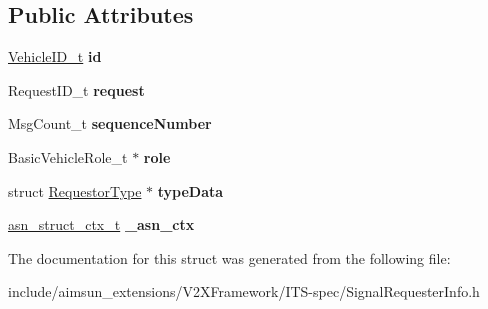 \subsection*{Public Attributes}
\begin{DoxyCompactItemize}
\item 
\hyperlink{structVehicleID}{Vehicle\+I\+D\+\_\+t} {\bfseries id}\hypertarget{structSignalRequesterInfo_af3175472ac3b7bd8cdb76166fe97465c}{}\label{structSignalRequesterInfo_af3175472ac3b7bd8cdb76166fe97465c}

\item 
Request\+I\+D\+\_\+t {\bfseries request}\hypertarget{structSignalRequesterInfo_ab98c6988435c103fba82e3397c63f6f2}{}\label{structSignalRequesterInfo_ab98c6988435c103fba82e3397c63f6f2}

\item 
Msg\+Count\+\_\+t {\bfseries sequence\+Number}\hypertarget{structSignalRequesterInfo_ab82a5a92546ccdc2cc8b646924099cfe}{}\label{structSignalRequesterInfo_ab82a5a92546ccdc2cc8b646924099cfe}

\item 
Basic\+Vehicle\+Role\+\_\+t $\ast$ {\bfseries role}\hypertarget{structSignalRequesterInfo_a3633da73f3760d5202231aa4b0719a43}{}\label{structSignalRequesterInfo_a3633da73f3760d5202231aa4b0719a43}

\item 
struct \hyperlink{structRequestorType}{Requestor\+Type} $\ast$ {\bfseries type\+Data}\hypertarget{structSignalRequesterInfo_ac1b2fcbc583423088f436e4e9fe26220}{}\label{structSignalRequesterInfo_ac1b2fcbc583423088f436e4e9fe26220}

\item 
\hyperlink{structasn__struct__ctx__s}{asn\+\_\+struct\+\_\+ctx\+\_\+t} {\bfseries \+\_\+asn\+\_\+ctx}\hypertarget{structSignalRequesterInfo_aa5bba153eac625d82760b5660686b6d3}{}\label{structSignalRequesterInfo_aa5bba153eac625d82760b5660686b6d3}

\end{DoxyCompactItemize}


The documentation for this struct was generated from the following file\+:\begin{DoxyCompactItemize}
\item 
include/aimsun\+\_\+extensions/\+V2\+X\+Framework/\+I\+T\+S-\/spec/Signal\+Requester\+Info.\+h\end{DoxyCompactItemize}
